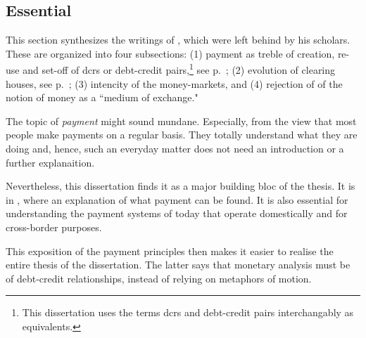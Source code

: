 \subsection{Essential \citeauthor{innes1913}}\label{sec:essential}

This section synthesizes the writings of \citeauthor{innes1913}, which were left behind by his scholars. These are organized into four subsections: (1) payment as treble of creation, re-use and set-off of \acfp{dcr} or debt-credit pairs,\footnote{This dissertation uses the terms \acfp{dcr} and debt-credit pairs interchangably as equivalents.} see p.~\pageref{sec:payment}; (2) evolution of clearing houses, see p.~\pageref{sec:evolution}; (3) intencity of the money-markets, and (4) rejection of of the notion of money as a ``medium of exchange."

The topic of \textit{payment} might sound mundane. Especially, from the view that most people make payments on a regular basis. They totally understand what they are doing and, hence, such an everyday matter does not need an introduction or a further explanaition.

Nevertheless, this dissertation finds it as a major building bloc of the thesis. It is in \cite{innes1913,innes1914}, where an explanation of what payment can be found. It is also essential for understanding the payment systems of today that operate domestically and for cross-border purposes. 

This exposition of the payment principles then makes it easier to realise the entire thesis of the dissertation. The latter says that monetary analysis must be of debt-credit relationships, instead of relying on metaphors of motion. 

